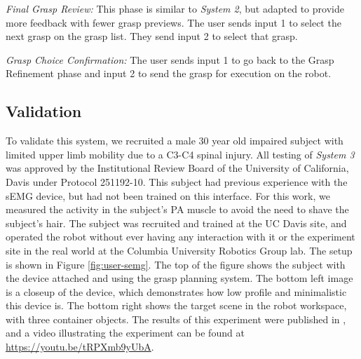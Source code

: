 \emph{Final Grasp Review:} This phase is similar to \emph{System 2}, but adapted to provide more feedback with fewer grasp previews. The user sends input 1 to select the next grasp on the grasp list. They send input 2 to select that grasp. 

\emph{Grasp Choice Confirmation:} The user sends input 1 to go back to the Grasp Refinement phase and input 2 to send the grasp for execution on the robot.


\subsection{Validation}
To validate this system, we recruited a male 30 year old impaired subject with limited upper limb mobility due to a C3-C4 spinal injury. All testing of \emph{System 3} was approved by the Institutional Review Board of the University of California, Davis under Protocol 251192-10. This subject had previous experience with the sEMG device, but had not been trained on this interface. For this work, we measured the activity in the subject's PA muscle to avoid the need to shave the subject's hair. The subject was recruited and trained at the UC Davis site, and operated the robot without ever having any interaction with it or the experiment site in the real world at the Columbia University Robotics Group lab. The setup is shown in Figure \ref{fig:user-semg}. The top of the figure shows the subject with the device attached and using the grasp planning system. The bottom left image is a closeup of the device, which demonstrates how low profile and minimalistic this device is. The bottom right shows the target scene in the robot workspace, with three container objects. The results of this experiment were published in \cite{Weisz2014}, and a video illustrating the experiment can be found at \url{https://youtu.be/tRPXmb9yUbA}.
